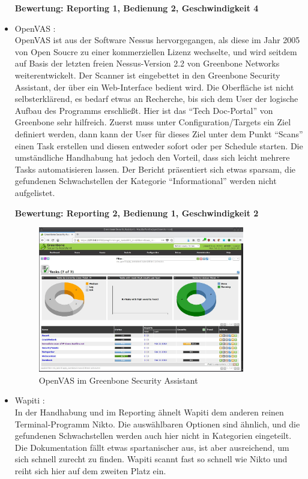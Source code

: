 \documentclass[12pt,oneside,a4paper,parskip]{scrbook}
\begin{document}
\begin{itemize}
            \textbf{Bewertung: Reporting 1, Bedienung 2, Geschwindigkeit 4}
          \item OpenVAS \cite{OpenVAS}:\\
            OpenVAS ist aus der Software Nessus hervorgegangen, als diese im Jahr 2005 von Open Soucre zu einer kommerziellen Lizenz wechselte, und wird seitdem auf Basis der letzten freien Nessus-Version 2.2 von Greenbone Networks weiterentwickelt. Der Scanner ist eingebettet in den Greenbone Security Assistant, der über ein Web-Interface bedient wird. Die Oberfläche ist nicht selbsterklärend, es bedarf etwas an Recherche, bis sich dem User der logische Aufbau des Programms erschließt. Hier ist das ``Tech Doc-Portal'' von Greenbone sehr hilfreich. Zuerst muss unter Configuration/Targets ein Ziel definiert werden, dann kann der User für dieses Ziel unter dem Punkt ``Scans'' einen Task erstellen und diesen entweder sofort oder per Schedule starten.
            Die umständliche Handhabung hat jedoch den Vorteil, dass sich leicht mehrere Tasks automatisieren lassen. Der Bericht präsentiert sich etwas sparsam, die gefundenen Schwachstellen der Kategorie ``Informational'' werden nicht aufgelistet.

            \textbf{Bewertung: Reporting 2, Bedienung 1, Geschwindigkeit 2}
            \begin{figure} [H]
              \centering
              \includegraphics[width=0.85\textwidth]{Images/OpenVAS}
              \caption[OpenVAS im Greenbone Security Assistant]{OpenVAS im Greenbone Security Assistant}
            \end{figure}
          \item Wapiti \cite{Wapiti}:\\
            In der Handhabung und im Reporting ähnelt Wapiti dem anderen reinen Terminal-Programm Nikto. Die auswählbaren Optionen sind ähnlich, und die gefundenen Schwachstellen werden auch hier nicht in Kategorien eingeteilt. Die Dokumentation fällt etwas spartanischer aus, ist aber ausreichend, um sich schnell zurecht zu finden. Wapiti scannt fast so schnell wie Nikto und reiht sich hier auf dem zweiten Platz ein.


\end{itemize}
\end{document}
